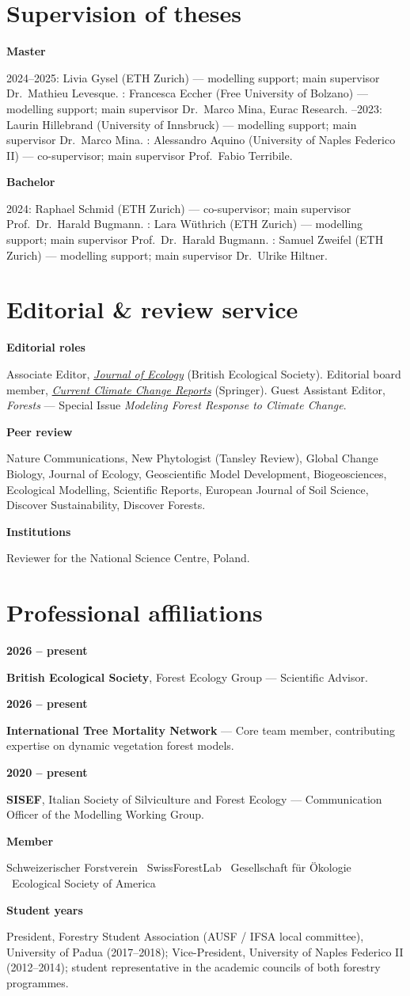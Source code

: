 \documentclass[10pt,a4paper]{article}
\newlength{\dcol}\setlength{\dcol}{3.5cm}
\newcommand{\defrow}[2]{%
  \noindent\begin{minipage}[t]{\dcol}\raggedright\footnotesize\bfseries\color{muted}#1\end{minipage}%
  \hspace{0.45cm}%
  \begin{minipage}[t]{\dimexpr\linewidth-\dcol-0.45cm\relax}\raggedright\small\color{inksoft}#2\end{minipage}\par\vspace{5pt}}
\begin{document}
\section*{Supervision of theses}
\defrow{Master}{2024--2025: Livia Gysel (ETH Zurich) --- modelling support; main supervisor Dr.~Mathieu Levesque. \newline 2023: Francesca Eccher (Free University of Bolzano) --- modelling support; main supervisor Dr.~Marco Mina, Eurac Research. \newline 2022--2023: Laurin Hillebrand (University of Innsbruck) --- modelling support; main supervisor Dr.~Marco Mina. \newline 2021: Alessandro Aquino (University of Naples Federico II) --- co-supervisor; main supervisor Prof.~Fabio Terribile.}
\defrow{Bachelor}{2024: Raphael Schmid (ETH Zurich) --- co-supervisor; main supervisor Prof.~Dr.~Harald Bugmann. \newline 2023: Lara W\"uthrich (ETH Zurich) --- modelling support; main supervisor Prof.~Dr.~Harald Bugmann. \newline 2022: Samuel Zweifel (ETH Zurich) --- modelling support; main supervisor Dr.~Ulrike Hiltner.}

\section*{Editorial \& review service}
\defrow{Editorial roles}{Associate Editor, \href{https://besjournals.onlinelibrary.wiley.com/journal/13652745}{\emph{Journal of Ecology}} (British Ecological Society). Editorial board member, \href{https://link.springer.com/journal/40641}{\emph{Current Climate Change Reports}} (Springer). Guest Assistant Editor, \emph{Forests} --- Special Issue \emph{Modeling Forest Response to Climate Change}.}
\defrow{Peer review}{Nature Communications, New Phytologist (Tansley Review), Global Change Biology, Journal of Ecology, Geoscientific Model Development, Biogeosciences, Ecological Modelling, Scientific Reports, European Journal of Soil Science, Discover Sustainability, Discover Forests.}
\defrow{Institutions}{Reviewer for the National Science Centre, Poland.}

\section*{Professional affiliations}
\defrow{2026 -- present}{\textbf{British Ecological Society}, Forest Ecology Group --- Scientific Advisor.}
\defrow{2026 -- present}{\textbf{International Tree Mortality Network} --- Core team member, contributing expertise on dynamic vegetation forest models.}
\defrow{2020 -- present}{\textbf{SISEF}, Italian Society of Silviculture and Forest Ecology --- Communication Officer of the Modelling Working Group.}
\defrow{Member}{Schweizerischer Forstverein \textperiodcentered\ SwissForestLab \textperiodcentered\ Gesellschaft f\"ur \"Okologie \textperiodcentered\ Ecological Society of America}
\defrow{Student years}{President, Forestry Student Association (AUSF / IFSA local committee), University of Padua (2017--2018); Vice-President, University of Naples Federico II (2012--2014); student representative in the academic councils of both forestry programmes.}
\end{document}
